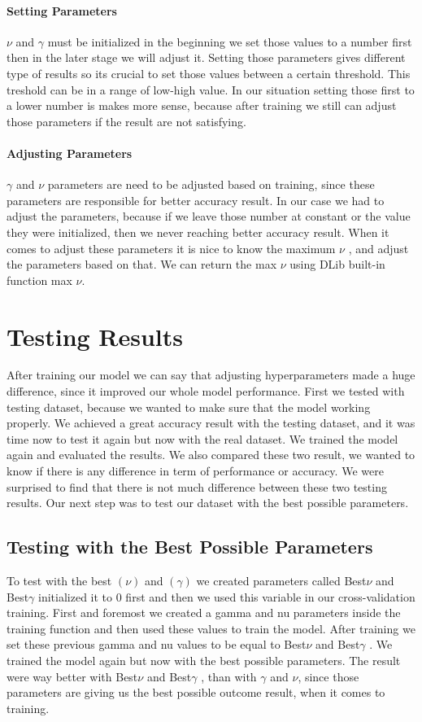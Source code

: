 \documentclass[english,12pt,oneside,a4paper]{article}
\begin{document}
		\paragraph{Setting Parameters}
		$\nu$  and $\gamma$ must be initialized in the beginning we set those values to a number first then in the later stage we will adjust it. Setting those parameters gives different type of results so its crucial to set those values between a certain threshold. This treshold can be in a range of low-high value. In our situation setting those first to a lower number is makes more sense, because after training we still can adjust those parameters if the result are not satisfying.
		\paragraph{Adjusting Parameters}
		 $\gamma$ and $\nu$  parameters are need to be adjusted based on training, since these parameters are responsible for better accuracy result. In our case we had to adjust the parameters, because if we leave those number at constant or the value they were initialized, then we never reaching better accuracy result. When it comes to adjust these parameters it is nice to know the maximum $\nu$ , and adjust the parameters based on that. We can return the max  $\nu$ using DLib built-in function max $\nu$.
		\section{Testing Results}
		After training our model we can say that adjusting hyperparameters made a huge difference, since it improved our whole model performance. First we tested with testing dataset, because we wanted to make sure that the model working properly. We achieved a great accuracy result with the testing dataset, and it was time now to test it again but now with the real dataset. We trained the model again and evaluated the results. We also compared these two result, we wanted to know if there is any difference in term of performance or accuracy. We were surprised to find that there is not much difference between these two testing results. Our next step was to test our dataset with the best possible parameters.
		\subsection{Testing with the Best Possible Parameters}
		To test with the best $(\nu)$ and $(\gamma)$ we created parameters called Best${\nu}$ and Best${\gamma}$ initialized it to 0 first and then we used this variable in our cross-validation training. First and foremost we created a gamma and nu parameters inside the training function and then used these values to train the model. After training  we set these  previous gamma and nu values to be equal to Best${\nu}$  and Best${\gamma}$ . We trained the model again but now with the best possible parameters. The result were way better with Best${\nu}$  and Best${\gamma}$ , than with  $\gamma$ and $\nu$, since those parameters are giving us the best possible outcome result, when it comes to training. 
\end{document}
